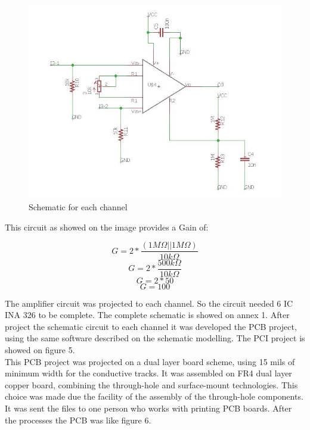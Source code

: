 \begin{figure}[!htpb]
\centering
\includegraphics[scale=0.7]{images/INA}
\caption{Schematic for each channel}
\end{figure}

This circuit as showed on the image provides a Gain of:

$$G=2*\frac{(1M\Omega||1M\Omega)}{10k\Omega}$$
$$G=2*\frac{500k\Omega}{10k\Omega}$$
$$G=2*50$$
$$G=100$$

The amplifier circuit was projected to each channel. So the circuit needed 6 IC
INA 326 to be complete. The complete schematic is showed on annex 1. After project
the schematic circuit to each channel it was developed the PCB project, using the
same software described on the schematic modelling. The PCI project is showed on figure 5.\\

This PCB project was projected on a dual layer board scheme, using 15 mils of
minimum width for the conductive tracks. It was assembled on FR4 dual layer copper
board, combining the through-hole and surface-mount technologies. This choice was
made due the facility of the assembly of the through-hole components. It was sent
the files to one person who works with printing PCB boards. After the processes
the PCB was like figure 6.\\

